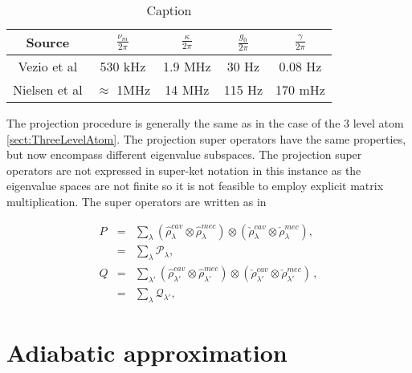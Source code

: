 \documentclass[12pt]{article}
\begin{document}
\begin{table}[]
    \centering
    \begin{tabular}{|c|c|c|c|c|}
        \hline
        Source & $\frac{\nu_m}{2\pi}$ & $\frac{\kappa}{2\pi}$ & $\frac{g_0}{2\pi}$&  $\frac{\gamma}{2\pi}$  \\
        \hline\hline
        Vezio et al \cite{VezioOMExperiment2020} & 530 kHz & 1.9 MHz &  30 Hz & 0.08 Hz \\
        \hline
        Nielsen et al \cite{NielsenMultimodeOptomechanicalMembrane2017} & $\approx$ 1MHz & 14 MHz & 115 Hz & 170 mHz\\
        \hline
    \end{tabular}
    \caption{Caption}
    \label{tab:my_label}
\end{table}

The projection procedure is generally the same as in the case of the 3 level atom \ref{sect:ThreeLevelAtom}. The projection super operators have the same properties, but now encompass different eigenvalue subspaces. The projection super operators are not expressed in super-ket notation in this instance as the eigenvalue spaces are not finite so it is not feasible to employ explicit matrix multiplication. The super operators are written as in \cite{YanesOptomechanicalCooling2020}

\begin{eqnarray}
  P &=& \sum_{\lambda} (\hat{\rho}_{\lambda}^{cav}\otimes\hat{\rho}_{\lambda}^{mec})\otimes(\check{\rho}_{\lambda}^{cav}\otimes\check{\rho}_{\lambda}^{mec}),\label{eq:projector_p}\\
  &=& \sum_\lambda \mathcal{P}_\lambda, \nonumber\\
  Q &=& \sum_{\lambda'} (\hat{\rho}_{\lambda'}^{cav}\otimes \hat{\rho}_{\lambda'}^{mec})\otimes(\check{\rho}_{\lambda'}^{cav}\otimes\check{\rho}_{\lambda'}^{mec})\label{eq:projector_q}\, ,\\
  &=& \sum_\lambda \mathcal{Q}_{\lambda'}, \nonumber
\end{eqnarray}

\section{Adiabatic approximation}



\end{document}

